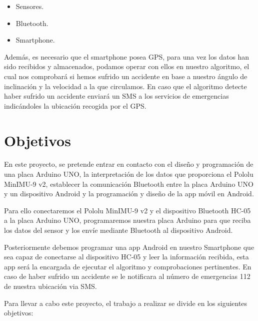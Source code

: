 		\begin{itemize}
			\item Sensores.
			\item Bluetooth.
			\item Smartphone.
		\end{itemize}
		
		Adem\'as, es necesario que el smartphone posea GPS, para una vez los datos han sido recibidos y almacenados, podamos operar con ellos en nuestro algoritmo, el cual nos comprobar\'a si hemos sufrido un accidente en base a nuestro \'angulo de inclinaci\'on y la velocidad a la que circulamos. En caso que el algoritmo detecte haber sufrido un accidente enviar\'a un SMS a los servicios de emergencias indic\'andoles la ubicaci\'on recogida por el GPS.
	
	
	\section{Objetivos}
	
		En este proyecto, se pretende entrar en contacto con el dise\~no y programaci\'on de una placa Arduino UNO, la interpretaci\'on de los datos que proporciona el Pololu MinIMU-9 v2, establecer la comunicaci\'on Bluetooth entre la placa Arduino UNO y un dispositivo Android y la programaci\'on y dise\~no de la app m\'ovil en Android.
	
		Para ello conectaremos el Pololu MinIMU-9 v2 y el dispositivo Bluetooth HC-05 a la placa Arduino UNO, programaremos nuestra placa Arduino para que reciba los datos del sensor y los env\'ie mediante Bluetooth al dispositivo Android.
		
		Posteriormente debemos programar una app Android en nuestro Smartphone que sea capaz de conectarse al dispositivo HC-05 y leer la informaci\'on recibida, esta app ser\'a la encargada de ejecutar el algoritmo y comprobaciones pertinentes. En caso de haber sufrido un accidente se le notificara al n\'umero de emergencias 112 de nuestra ubicaci\'on via SMS.
		
		Para llevar a cabo este proyecto, el trabajo a realizar se divide en los siguientes objetivos:
		
